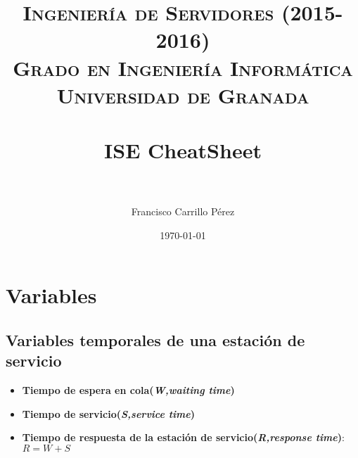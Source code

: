 

\title{	
	\normalfont \normalsize 
	\textsc{{\bf Ingeniería de Servidores (2015-2016)} \\ Grado en Ingeniería Informática \\ Universidad de Granada} \\ [25pt] %
	\horrule{0.5pt} \\[0.4cm] %
	\huge ISE CheatSheet \\ %
	\horrule{2pt} \\[0.5cm] %
}

\author{Francisco Carrillo Pérez} %

\date{\normalsize\today} %



	
	\maketitle %
	
	\newpage %
	
	\tableofcontents %
	
	\newpage
	
\section{Variables}

\subsection{Variables temporales de una estación de servicio}
\begin{itemize}
	\item \textbf{Tiempo de espera en cola(\textit{W,waiting time})}
	\item \textbf{Tiempo de servicio(\textit{S,service time})}
	\item \textbf{Tiempo de respuesta de la estación de servicio(\textit{R,response time})}:\\
	$R=W+S$
\end{itemize}
